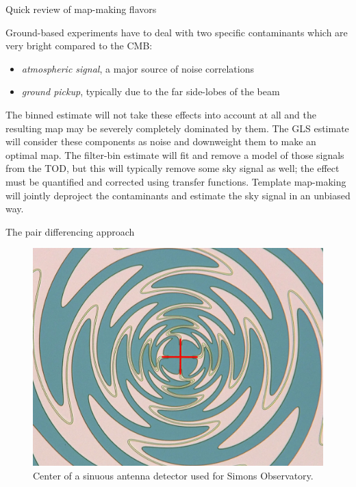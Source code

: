 \documentclass[final]{beamer}
\newlength{\colwidth}
\begin{document}
\begin{frame}[t]
\begin{columns}[t]
\begin{column}{\colwidth}
\begin{alertblock}{Quick review of map-making flavors}

        Ground-based experiments have to deal with two specific contaminants which are very bright compared to the CMB:

        \begin{itemize}
          \item \emph{atmospheric signal}, a major source of noise correlations
          \item \emph{ground pickup}, typically due to the far side-lobes of the beam
        \end{itemize}

        The binned estimate will not take these effects into account at all and the resulting map may be severely completely dominated by them.
        The GLS estimate will consider these components as noise and downweight them to make an optimal map.
        The filter-bin estimate will fit and remove a model of those signals from the TOD, but this will typically remove some sky signal as well; the effect must be quantified and corrected using transfer functions.
        Template map-making will jointly deproject the contaminants and estimate the sky signal in an unbiased way.


      \end{alertblock}

      \begin{block}{The pair differencing approach}

        \begin{figure}
          \includegraphics[width=\linewidth]{figures/sinuous-antenna-center-red.png}
          \caption{Center of a sinuous antenna detector used for Simons Observatory.}
          \label{fig:sinuous-antenna}
        \end{figure}


\end{block}
\end{column}
\end{columns}
\end{frame}
\end{document}
